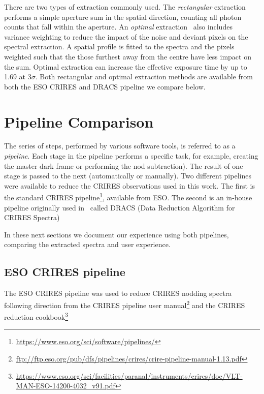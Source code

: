There are two types of extraction commonly used. The \emph{rectangular} extraction performs a simple aperture sum in the spatial direction, counting all photon counts that fall within the aperture. An \emph{optimal} extraction~\citep{horne_optimal_1986} also includes variance weighting to reduce the impact of the noise and deviant pixels on the spectral extraction. A spatial profile is fitted to the spectra and the pixels weighted such that the those furthest away from the centre have less impact on the sum. Optimal extraction can increase the effective exposure time by up to 1.69 at \(3 \sigma\)\citep{horne_optimal_1986}. Both rectangular and optimal extraction methods are available from both the ESO CRIRES and DRACS pipeline we compare below.

\section{Pipeline Comparison}
\label{sec:pipelines}
The series of steps, performed by various software tools, is referred to as a \emph{pipeline}. Each stage in the pipeline performs a specific task, for example, creating the master dark frame or performing the nod subtraction). The result of one stage is passed to the next (automatically or manually). Two different pipelines were available to reduce the CRIRES observations used in this work. The first is the standard CRIRES pipeline\footnote{\href{https://www.eso.org/sci/software/pipelines/}{https://www.eso.org/sci/software/pipelines/}}, available from ESO.
The second is an in-house pipeline originally  used in~\citet{figueira_radial_2010} called DRACS (Data Reduction Algorithm for CRIRES Spectra) 

In these next sections we document our experience using both pipelines, comparing the extracted spectra and user experience.


\subsection{ESO CRIRES pipeline}
\label{subsec:eso-crires}
The ESO CRIRES pipeline was used to reduce CRIRES nodding spectra following direction from the CRIRES pipeline user manual\footnote{\href{ftp://ftp.eso.org/pub/dfs/pipelines/crires/crire-pipeline-manual-1.13.pdf}{ftp://ftp.eso.org/pub/dfs/pipelines/crires/crire-pipeline-manual-1.13.pdf}} and the CRIRES reduction cookbook\footnote{\href{https://www.eso.org/sci/facilities/paranal/instruments/crires/doc/VLT-MAN-ESO-14200-4032\_v91.pdf}{https://www.eso.org/sci/facilities/paranal/instruments/crires/doc/VLT-MAN-ESO-14200-4032\_v91.pdf}}

